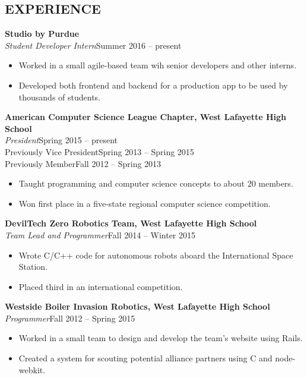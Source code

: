 \documentclass[line,margin]{res}
\begin{document}
\begin{resume}
  \section{EXPERIENCE}
  {\bf\rmfamily Studio by Purdue}\\
  \emph{Student Developer Intern}\hfill Summer 2016 -- present
  \begin{itemize}  \itemsep -2pt %
  \item Worked in a small agile-based team wih senior developers and other interns.
  \item Developed both frontend and backend for a production app to be used by thousands of students.
  \end{itemize}


  {\bf\rmfamily American Computer Science League Chapter, West Lafayette High School}\\
  \emph{President}\hfill Spring 2015 -- present\\
  Previously Vice President\hfill Spring 2013 -- Spring 2015\\
  Previously Member\hfill Fall 2012 -- Spring 2013
  \begin{itemize}  \itemsep -2pt %
  \item Taught programming and computer science concepts to about 20 members.
  \item Won first place in a five-state regional computer science competition.
  \end{itemize}

  {\bf\rmfamily DevilTech Zero Robotics Team, West Lafayette High School}\\
  \emph{Team Lead and Programmer}\hfill Fall 2014 -- Winter 2015
  \begin{itemize}  \itemsep -2pt %
  \item Wrote C/C++ code for autonomous robots aboard the International Space Station.
  \item Placed third in an international competition.
  \end{itemize}

  {\bf\rmfamily  Westside Boiler Invasion Robotics, West Lafayette High School}\\
  \emph{Programmer}\hfill Fall 2012 -- Spring 2015
  \begin{itemize}  \itemsep -2pt %
  \item Worked in a small team to design and develop the team's website using Rails.
  \item Created a system for scouting potential alliance partners using C and node-webkit.
  \end{itemize}


\end{resume}
\end{document}
